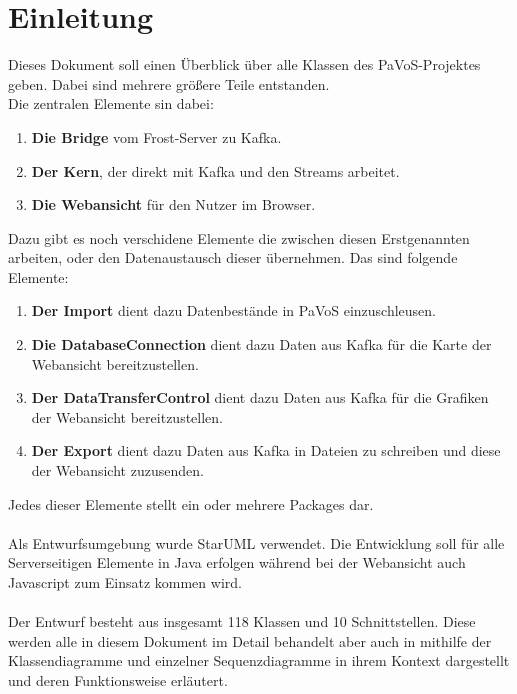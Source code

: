 \chapter{Einleitung}
Dieses Dokument soll einen Überblick über alle Klassen des PaVoS-Projektes geben. Dabei sind mehrere größere Teile entstanden.\\
Die zentralen Elemente sin dabei:
\begin{enumerate}
	\item \textbf{Die Bridge} vom Frost-Server zu Kafka.
	\item \textbf{Der Kern}, der direkt mit Kafka und den Streams arbeitet.
	\item \textbf{Die Webansicht} für den Nutzer im Browser.
\end{enumerate}
Dazu gibt es noch verschidene Elemente die zwischen diesen Erstgenannten arbeiten, oder den Datenaustausch dieser übernehmen. Das sind folgende Elemente:
\begin{enumerate}
	\item \textbf{Der Import} dient dazu Datenbestände in PaVoS einzuschleusen.
	\item \textbf{Die DatabaseConnection} dient dazu Daten aus Kafka für die Karte der Webansicht bereitzustellen.
	\item \textbf{Der DataTransferControl} dient dazu Daten aus Kafka für die Grafiken der Webansicht bereitzustellen.
	\item \textbf{Der Export} dient dazu Daten aus Kafka in Dateien zu schreiben und diese der Webansicht zuzusenden.
\end{enumerate}
Jedes dieser Elemente stellt ein oder mehrere Packages dar.\\\\
Als Entwurfsumgebung wurde StarUML verwendet. Die Entwicklung soll für alle Serverseitigen Elemente in Java erfolgen während bei der Webansicht auch Javascript zum Einsatz kommen wird.\\\\
Der Entwurf besteht aus insgesamt 118 Klassen und 10 Schnittstellen. Diese werden alle in diesem Dokument im Detail behandelt aber auch in mithilfe der Klassendiagramme und einzelner Sequenzdiagramme in ihrem Kontext dargestellt und deren Funktionsweise erläutert.
